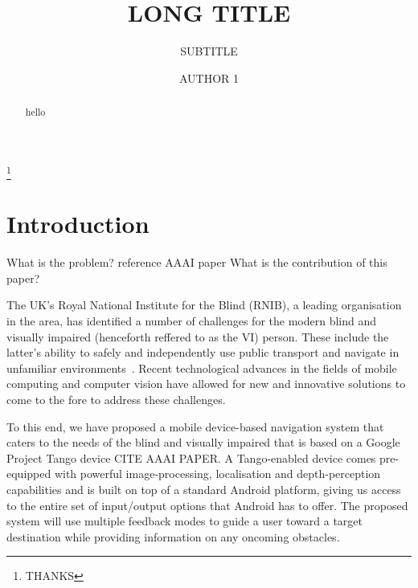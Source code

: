\documentclass[format=sigconf, review=true, screen=true, anonymous=true]{acmart}
\begin{document}

\title[SHORT TITLE]{LONG TITLE}
\subtitle{SUBTITLE}

\author{AUTHOR 1}

\thanks{THANKS}



\maketitle

\begin{abstract}
  hello
\end{abstract}

\section{Introduction}

What is the problem? reference AAAI paper
What is the contribution of this paper?

The UK's Royal National Institute for the Blind (RNIB), a leading organisation in the area, has identified a number of challenges for the modern blind and visually impaired (henceforth reffered to as the VI) person. These include the latter's ability to safely and independently use public transport and navigate in unfamiliar environments~\cite{rnib-objectives}. Recent technological advances in the fields of mobile computing and computer vision have allowed for new and innovative solutions to come to the fore to address these challenges. 

To this end, we have proposed a mobile device-based navigation system that caters to the needs of the blind and visually impaired that is based on a Google Project Tango device {CITE AAAI PAPER}. A Tango-enabled device comes pre-equipped with powerful image-processing, localisation and depth-perception capabilities and is built on top of a standard Android platform, giving us access to the entire set of input/output options that Android has to offer. The proposed system will use multiple feedback modes to guide a user toward a target destination while providing information on any oncoming obstacles.
\end{document}
